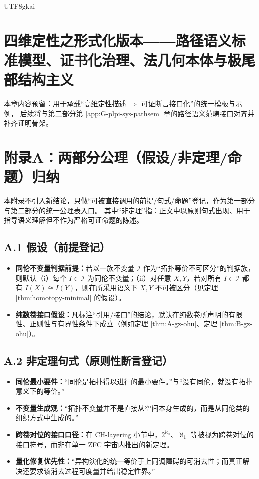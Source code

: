 \documentclass[12pt]{article}
\begin{document}
\begin{CJK*}{UTF8}{gkai}
\clearpage

\section{四维定性之形式化版本——路径语义标准模型、证书化治理、法几何本体与极尾部结构主义}\label{app:H-4d-typing}

本章内容预留：用于承载“高维定性描述 $\Rightarrow$ 可证断言接口化”的统一模板与示例，
后续将与第二部分第 \ref{app:G-plpi-sys-pathsem} 章的路径语义范畴接口对齐并补齐证明骨架。

\clearpage

\section*{附录A：两部分公理（假设/非定理/命题）归纳}
{}

本附录不引入新结论，只做“可被直接调用的前提/句式/命题”登记，作为第一部分与第二部分的统一公理表入口。
其中“非定理”指：正文中以原则句式出现、用于指导语义理解但不作为严格可证命题的陈述。

\subsection*{A.1 假设（前提登记）}
\begin{itemize}
  \item \textbf{同伦不变量判据前提：}若以一族不变量 $\mathcal{I}$ 作为“拓扑等价不可区分”的判据族，则默认（i）每个 $I\in\mathcal{I}$ 为同伦不变量；（ii）对任意 $X,Y$，若对所有
    $I\in\mathcal{I}$ 都有 $I(X)\cong I(Y)$，则在所采用语义下 $X,Y$ 不可被区分（见定理 \ref{thm:homotopy-minimal} 的假设）。
  \item \textbf{纯数卷接口假设：}凡标注“引用/接口”的结论，默认在纯数卷所声明的有限性、正则性与有界性条件下成立（例如定理 \ref{thm:A-gz-ohu}、定理 \ref{thm:B-gz-ohu}）。
\end{itemize}

\subsection*{A.2 非定理句式（原则性断言登记）}
\begin{itemize}
  \item \textbf{同伦最小要件：}“同伦是拓扑得以进行的最小要件。”与“没有同伦，就没有拓扑意义下的等价。”
  \item \textbf{不变量生成观：}“拓扑不变量并不是直接从空间本身生成的，而是从同伦类的组织方式中生成的。”
  \item \textbf{跨卷对位的接口口径：}在 CH-layering 小节中，$2^{\aleph_0}$、$\aleph_1$ 等被视为跨卷对位的接口符号，而非在单一 ZFC 宇宙内推出的新定理。
  \item \textbf{量化修复优先性：}“异构演化的统一等价于上同调障碍的可消去性；而真正解决还要求该消去过程可度量并给出稳定性界。”
\end{itemize}


\end{CJK*}
\end{document}
